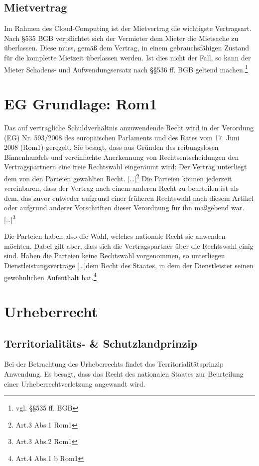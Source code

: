 \subsection{Mietvertrag}
Im Rahmen des Cloud-Computing ist der Mietvertrag die wichtigste Vertragsart.\newline
Nach §535 BGB verpflichtet sich der Vermieter dem Mieter die Mietsache zu \"uberlassen. Diese muss, gem\"a{\ss} dem Vertrag, in einem gebrauchsf\"ahigen Zustand f\"ur die komplette Mietzeit \"uberlassen werden. Ist dies nicht der Fall, so kann der Mieter Schadens- und Aufwendungsersatz nach §§536 ff. BGB geltend machen.\footnote{vgl.  §§535 ff. BGB}
  \label{mietvertrag}

\section{EG Grundlage: Rom1}
Das auf vertragliche Schuldverh\"altnis anzuwendende Recht wird in der  {\glqq}Verordung (EG) Nr. 593/2008 des europ\"aischen Parlaments und des Rates vom 17. Juni 2008 (Rom1){\grqq} geregelt. Sie besagt, dass aus Gr\"unden des reibungslosen Binnenhandels und vereinfachte Anerkennung von Rechtsentscheidungen den Vertragspartnern eine freie Rechtswahl einger\"aumt wird:{\glqq} Der Vertrag unterliegt dem von den Parteien gew\"ahlten Recht. […]{\grqq}\footnote{Art.3 Abs.1 Rom1}
\newline
{\glqq}Die Parteien k\"onnen jederzeit vereinbaren, dass der Vertrag nach einem anderen Recht zu beurteilen ist als dem, das zuvor entweder aufgrund einer fr\"uheren Rechtswahl nach diesem Artikel oder aufgrund anderer Vorschriften dieser Verordnung f\"ur ihn ma{\ss}gebend war. […]{\grqq}\footnote{Art.3 Abs.2 Rom1}\newline

Die Parteien haben also die Wahl, welches nationale Recht sie anwenden m\"ochten. Dabei gilt aber, dass sich die Vertragspartner \"uber die Rechtswahl einig sind. Haben die Parteien keine Rechtswahl vorgenommen, so unterliegen Dienstleistungsvertr\"age {\glqq}[…]dem Recht des Staates, in dem der Dienstleister seinen gew\"ohnlichen Aufenthalt hat.{\grqq}\footnote{Art.4 Abs.1 b Rom1}

\section{Urheberrecht}
\subsection{Territorialit\"ats- \& Schutzlandprinzip}
Bei der Betrachtung des Urheberrechts findet das Territorialit\"atsprinzip Anwendung. Es besagt, dass das Recht des nationalen Staates zur Beurteilung einer Urheberrechtverletzung angewandt wird.\newline

